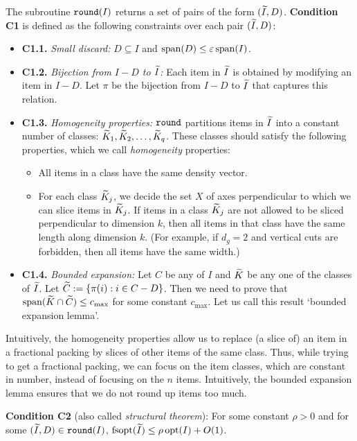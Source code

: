 The subroutine $\operatorname{\mathtt{round}}(I)$ returns a set of pairs of the form $(\widetilde{I}, D)$.
\textbf{Condition C1} is defined as the following constraints over each pair $(\widetilde{I}, D)$:
\begin{itemize}
\item {\bf C1.1.} {\em Small discard:} $D \subseteq I$ and $\operatorname{span}(D) \le \varepsilon\operatorname{span}(I)$.
\item {\bf C1.2.} {\em Bijection from $I-D$ to $\widetilde{I}$:}
    Each item in $\widetilde{I}$ is obtained by modifying an item in $I-D$.
    Let $\pi$ be the bijection from $I-D$ to $\widetilde{I}$ that captures this relation.
\item {\bf C1.3.} {\em Homogeneity properties:}
    $\operatorname{\mathtt{round}}$ partitions items in $\widetilde{I}$ into a constant number of classes:
    $\widetilde{K}_1, \widetilde{K}_2, \ldots, \widetilde{K}_q$. These classes should satisfy the following properties,
    which we call \emph{homogeneity} properties:
    \begin{itemize}
    \item All items in a class have the same density vector.
    \item For each class $\widetilde{K}_j$, we decide the set $X$ of axes perpendicular to which we can
        slice items in $\widetilde{K}_j$. If items in a class $\widetilde{K}_j$ are not allowed to be
        sliced perpendicular to dimension $k$, then all items in that class have
        the same length along dimension $k$.
        (For example, if $d_g=2$ and vertical cuts are forbidden, then all items
        have the same width.)
    \end{itemize}
\item {\bf C1.4.} {\em Bounded expansion:}
    Let $C$ be any \config{} of $I$ and $\widetilde{K}$ be any one of the classes of $\widetilde{I}$.
    Let $\widetilde{C} := \{\pi(i): i \in C - D\}$. Then we need to prove that
    $\operatorname{span}(\widetilde{K} \cap \widetilde{C}) \le c_{\max}$ for some constant $c_{\max}$.
    Let us call this result `bounded expansion lemma'.
\end{itemize}

Intuitively, the homogeneity properties allow us to replace (a slice of) an item
in a fractional packing by slices of other items of the same class.
Thus, while trying to get a fractional packing, we can focus on the item classes,
which are constant in number, instead of focusing on the $n$ items.
Intuitively, the bounded expansion lemma ensures that we do not round up items too much.

\textbf{Condition C2} (also called \emph{structural theorem}):
For some constant $\rho > 0$ and for some $(\widetilde{I}, D) \in \operatorname{\mathtt{round}}(I)$,
$\operatorname{fsopt}(\widetilde{I}) \le \rho\operatorname{opt}(I) + O(1)$.

